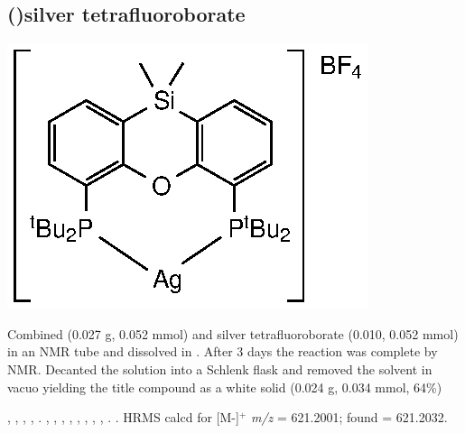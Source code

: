 

\subsection*{(\tBuSixantphos)silver tetrafluoroborate}
\begin{structure}[h]
\begin{center}
\includegraphics{../Structures/SitBuSilverBF4.eps}
\end{center}
\end{structure}
Combined \tBusixantphos{} (0.027 g, 0.052 mmol) and silver tetrafluoroborate (0.010, 0.052 mmol) in an NMR tube and dissolved in .  After 3 days the reaction was complete by NMR.  Decanted the solution into a Schlenk flask and removed the solvent in vacuo yielding the title compound as a white solid (0.024 g, 0.034 mmol, 64\%)

,
,
,
,
.
,
,
,
,
,
,
, %
,
.
.
HRMS calcd for  [M-]$^+$ \emph{m/z} = 621.2001; found = 621.2032.

